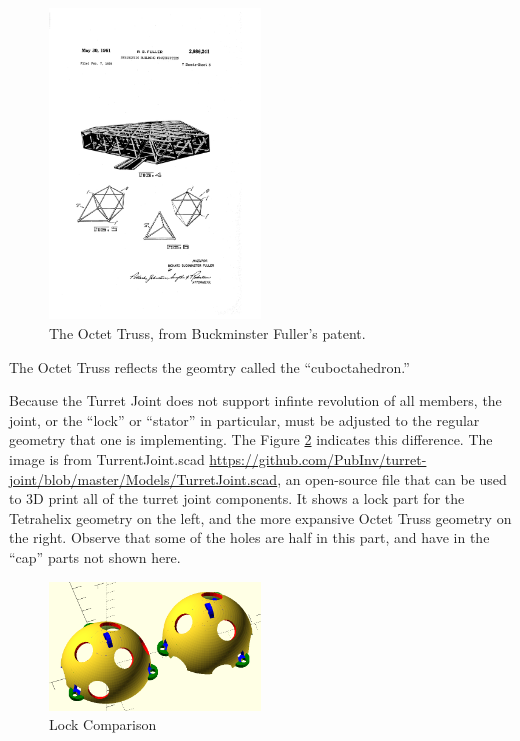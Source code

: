 \documentclass[12pt]{article}
\begin{document}
\begin{figure}[!ht]
  \centering
    \includegraphics[width=0.5\textwidth]{US2986241-2.png}
    \caption[The Octet Truss]{The Octet Truss, from Buckminster Fuller's patent.}
      \label{octet-truss-patent}
\end{figure}

The Octet Truss reflects the geomtry called the ``cuboctahedron.''

Because the Turret Joint does not support infinte revolution of all members, the joint, or the ``lock'' or ``stator'' in particular,
must be adjusted to the regular geometry that one is implementing.  The Figure \ref{lockcomparison} indicates this difference.
The image is from TurrentJoint.scad
\href{https://github.com/PubInv/turret-joint/blob/master/Models/TurretJoint.scad}{https://github.com/PubInv/turret-joint/blob/master/Models/TurretJoint.scad}, an
open-source file that can be used to 3D print all of the turret joint components. It shows a lock part for the Tetrahelix geometry
on the left, and the more expansive Octet Truss geometry on the right. Observe that some of the holes are half in this part,
and have in the ``cap'' parts not shown here.

\begin{figure}[!ht]
  \centering
    \includegraphics[width=0.5\textwidth]{TetrahelixLockVsOctetTrussLock.png}
    \caption[Lock Comparison]{Lock Comparison}
      \label{lockcomparison}
\end{figure}
\end{document}
